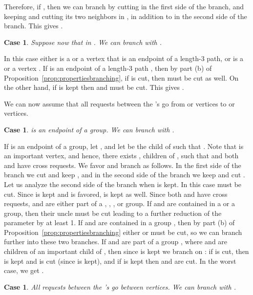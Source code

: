 \documentclass[11pt]{article}
\newtheorem{case}[theorem]{Case}
\begin{document}
Therefore, if , then we can branch by cutting  in the first side of the branch, and keeping  and cutting its two neighbors in , in addition to  in the second side of the branch. This gives .

\begin{case}
\label{case:400}
Suppose now that  in . We can branch with .
\end{case}

In this case either  is a  or a  vertex that is an endpoint of a length-3 path, or  is a  or a  vertex . If  is an endpoint of a length-3 path , then by part (b) of Proposition~\ref{prop:propertiesbranching}, if  is cut, then  must be cut as well. On the other hand, if  is kept then  and  must be cut. This gives .

We can now assume that all requests between the 's go from  or  vertices to  or  vertices.

\begin{case}
\label{case:500}
 is an endpoint of a  group. We can branch with .
\end{case}


If  is an endpoint of a  group, let , and let  be the child of  such that .  Note that  is an important vertex, and hence, there exists , children of , such that  and both  and  have cross requests. We favor  and branch as follows. In the first side of the branch we cut  and keep , and in the second side of the branch we keep  and cut . Let us analyze the second side of the branch when  is kept. In this case  must be cut. Since  is kept and is favored,  is kept as well. Since both  and  have cross requests,  and  are either part of a , , , or  group. If  and  are contained in a  or a  group, then their uncle must be cut leading to a further reduction of the parameter by at least 1. If  and  are contained in a  group , then by part (b) of Proposition~\ref{prop:propertiesbranching} either  or  must be cut, so we can branch further into these two branches. If  and  are part of a  group , where  and  are children of an important child of , then since  is kept we branch on : if  is cut, then  is kept and  is cut (since  is kept), and if  is kept then  and  are cut. In the worst case, we get .

\begin{case}
\label{case:600}
All requests between the 's go between  vertices. We can branch with .
\end{case}
\end{document}
